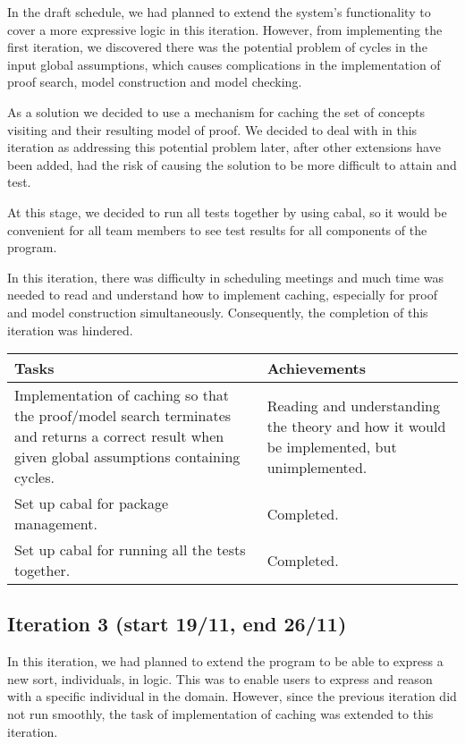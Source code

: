 In the draft schedule, we had planned to extend the system's functionality to cover a more expressive logic in this iteration. However, from implementing the first iteration, we discovered there was the potential problem of cycles in the input global assumptions, which causes complications in the implementation of proof search, model construction and model checking.

As a solution we decided to use a mechanism for caching the set of concepts visiting and their resulting model of proof. We decided to deal with in this iteration as addressing this potential problem later, after other extensions have been added, had the risk of causing the solution to be more difficult to attain and test.

At this stage, we decided to run all tests together by using cabal, so it would be convenient for all team members to see test results for all components of the program.

In this iteration, there was difficulty in scheduling meetings and much time was needed to read and understand how to implement caching, especially for proof and model construction simultaneously. Consequently, the completion of this iteration was hindered.

\begin{center}
\begin{longtable}{| p{7cm} | p{8cm} |}
\hline
\textbf{Tasks} & \textbf{Achievements} \\
\hline
Implementation of caching so that the proof/model search terminates and returns a correct result when given global assumptions containing cycles. & Reading and understanding the theory and how it would be implemented, but unimplemented.\\
\hline
Set up cabal for package management. & Completed.\\
\hline
Set up cabal for running all the tests together. & Completed.\\
\hline
\end{longtable}
\end{center}

\subsection*{Iteration 3 (start 19/11, end 26/11)}

In this iteration, we had planned to extend the program to be able to express a new sort, individuals, in logic. This was to enable users to express and reason with a specific individual in the domain. However, since the previous iteration did not run smoothly, the task of implementation of caching was extended to this iteration.

